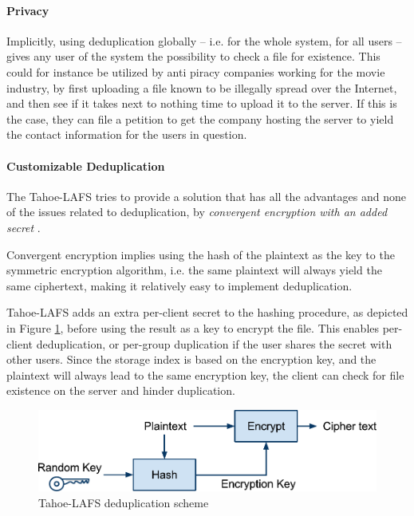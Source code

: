 \documentclass[pdftex,english,10pt,b5paper,twoside]{book}
\begin{document}
\paragraph{Privacy} Implicitly, using deduplication globally -- i.e. for the
whole system, for all users -- gives any user of the system the possibility to
check a file for existence. This could for instance be utilized by anti piracy
companies working for the movie industry, by first uploading a file known to be
illegally spread over the Internet, and then see if it takes next to nothing
time to upload it to the server. If this is the case, they can file a petition
to get the company hosting the server to yield the contact information for the
users in question.

\paragraph{Customizable Deduplication} The Tahoe-\ac{LAFS} tries to provide a
solution that has all the advantages and none of the issues related to
deduplication, by \emph{convergent encryption with an added secret}
\cite{tahoe}.

Convergent encryption implies using the hash of the plaintext as the key to the
symmetric encryption algorithm, i.e. the same plaintext will always yield the
same ciphertext, making it relatively easy to implement deduplication.

Tahoe-\ac{LAFS} adds an extra per-client secret to the hashing procedure, as
depicted in Figure \ref{fig:tahoe:dedup}, before using the result as a key to
encrypt the file. This enables per-client deduplication, or per-group
duplication if the user shares the secret with other users. Since the storage
index is based on the encryption key, and the plaintext will always lead to the
same encryption key, the client can check for file existence on the server and
hinder duplication.

\begin{figure}[!h]
    \centering
    \includegraphics[scale=0.55]{TahoeDeduplication.pdf}
    \caption{Tahoe-LAFS deduplication scheme}
    \label{fig:tahoe:dedup}
\end{figure}
\end{document}
